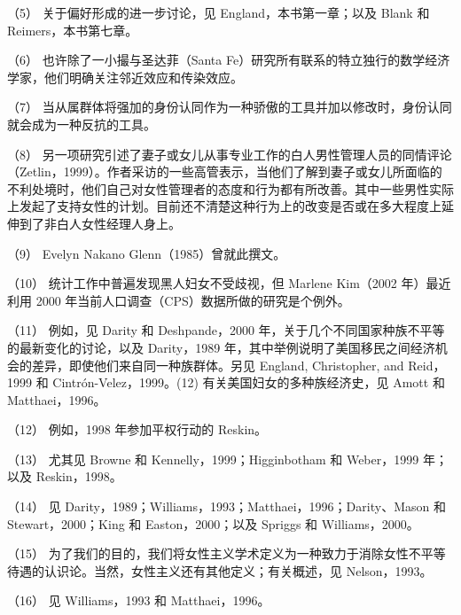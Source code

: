 \documentclass[UTF8]{ctexart}
\begin{document}
（5） 关于偏好形成的进一步讨论，见 England，本书第一章；以及 Blank 和 Reimers，本书第七章。


（6） 也许除了一小撮与圣达菲（Santa Fe）研究所有联系的特立独行的数学经济学家，他们明确关注邻近效应和传染效应。


（7） 当从属群体将强加的身份认同作为一种骄傲的工具并加以修改时，身份认同就会成为一种反抗的工具。


（8） 另一项研究引述了妻子或女儿从事专业工作的白人男性管理人员的同情评论（Zetlin，1999）。作者采访的一些高管表示，当他们了解到妻子或女儿所面临的不利处境时，他们自己对女性管理者的态度和行为都有所改善。其中一些男性实际上发起了支持女性的计划。目前还不清楚这种行为上的改变是否或在多大程度上延伸到了非白人女性经理人身上。


（9） Evelyn Nakano Glenn（1985）曾就此撰文。


（10） 统计工作中普遍发现黑人妇女不受歧视，但 Marlene Kim（2002 年）最近利用 2000 年当前人口调查（CPS）数据所做的研究是个例外。


（11） 例如，见 Darity 和 Deshpande，2000 年，关于几个不同国家种族不平等的最新变化的讨论，以及 Darity，1989 年，其中举例说明了美国移民之间经济机会的差异，即使他们来自同一种族群体。另见 England, Christopher, and Reid，1999 和 Cintrón-Velez，1999。(12) 有关美国妇女的多种族经济史，见 Amott 和 Matthaei，1996。


（12） 例如，1998 年参加平权行动的 Reskin。


（13） 尤其见 Browne 和 Kennelly，1999；Higginbotham 和 Weber，1999 年；以及 Reskin，1998。


（14） 见 Darity，1989；Williams，1993；Matthaei，1996；Darity、Mason 和 Stewart，2000；King 和 Easton，2000；以及 Spriggs 和 Williams，2000。


（15） 为了我们的目的，我们将女性主义学术定义为一种致力于消除女性不平等待遇的认识论。当然，女性主义还有其他定义；有关概述，见 Nelson，1993。


（16） 见 Williams，1993 和 Matthaei，1996。
\end{document}

